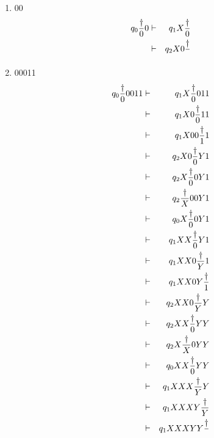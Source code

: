 \documentclass[12pt,a4paper,twoside]{article}  %
\begin{document}
\begin{enumerate}

\item 00
\begin{eqnarray}
q_0 {\dagger\over{0}}0 &\vdash& q_1 X{\dagger\over{0}} \nonumber\\
      &\vdash& q_2 X0{\dagger\over{ }} \nonumber
\end{eqnarray}

\item 00011
\begin{eqnarray}
q_0 {\dagger\over{0}}0011 &\vdash& q_1 X{\dagger\over{0}}011 \nonumber\\
         &\vdash& q_1 X0{\dagger\over{0}}11 \nonumber\\
         &\vdash& q_1 X00{\dagger\over{1}}1 \nonumber\\
         &\vdash& q_2 X0{\dagger\over{0}}Y1 \nonumber\\
         &\vdash& q_2 X{\dagger\over{0}}0Y1 \nonumber\\
         &\vdash& q_2 {\dagger\over{X}}00Y1 \nonumber\\
         &\vdash& q_0 X{\dagger\over{0}}0Y1 \nonumber\\
         &\vdash& q_1 XX{\dagger\over{0}}Y1 \nonumber\\
         &\vdash& q_1 XX0{\dagger\over{Y}}1 \nonumber\\
         &\vdash& q_1 XX0Y{\dagger\over{1}} \nonumber\\
         &\vdash& q_2 XX0{\dagger\over{Y}}Y \nonumber\\
         &\vdash& q_2 XX{\dagger\over{0}}YY \nonumber\\
         &\vdash& q_2 X{\dagger\over{X}}0YY \nonumber\\
         &\vdash& q_0 XX{\dagger\over{0}}YY \nonumber\\
         &\vdash& q_1 XXX{\dagger\over{Y}}Y \nonumber\\
         &\vdash& q_1 XXXY{\dagger\over{Y}} \nonumber\\
         &\vdash& q_1 XXXYY{\dagger\over{ }}\nonumber
\end{eqnarray}


\end{enumerate}
\end{document}
